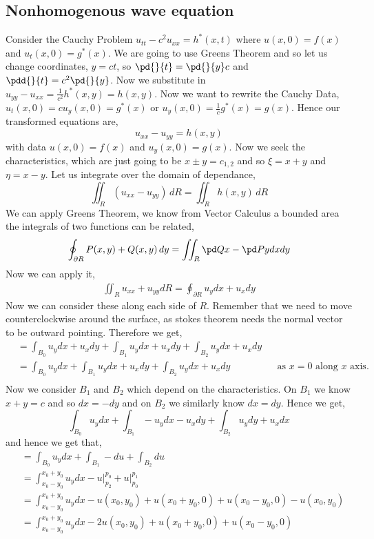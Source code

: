 \subsection{Nonhomogenous wave equation}
Consider the Cauchy Problem $u_{tt} - c^2u_{xx} = h^*(x, t)$ where $u(x, 0)= f(x)$ and $u_t(x, 0) = g^*(x)$. We are going to use Greens Theorem and so let us change coordinates, $y = ct$, so $\pd{}{t} = \pd{}{y}c$ and $\pdd{}{t} = c^2\pd{}{y}$. Now we substitute in $u_{yy} - u_{xx} = \frac{1}{c^2}h^*(x, y) = h(x, y)$. Now we want to rewrite the Cauchy Data, $u_{t} (x, 0) = cu_y(x, 0) = g^*(x)$ or $u_y(x, 0) = \frac{1}{c}g^*(x) = g(x)$. Hence our transformed equations are,
$$ u_{xx} - u_{yy} = h(x, y) $$
with data $u(x, 0) = f(x)$ and $u_y(x, 0) = g(x)$. Now we seek the characteristics, which are just going to be $x \pm y = c_{1, 2}$ and so $\xi = x + y$ and $\eta = x - y$.
Let us integrate over the domain of dependance,
$$ \iint_R (u_{xx} - u_{yy})\, dR = \iint_R h(x, y)\,dR $$
We can apply Greens Theorem, we know from Vector Calculus a bounded area the integrals of two functions can be related,
$$ \oint_{\partial R} P(x, y) + Q(x, y)\, dy = \iint_{R} \pd Q x - \pd P y dxdy $$
Now we can apply it,
\begin{align*}
  \iint_{R} u_{xx} + u_{yy} dR = \oint_{\partial R} u_ydx + u_xdy
\end{align*}
Now we can consider these along each side of $R$. Remember that we need to move counterclockwise around the surface, as stokes theorem needs the normal vector to be outward pointing. Therefore we get,
\begin{align*}
  &= \int_{B_0} u_ydx + u_xdy + \int_{B_1} u_ydx + u_xdy + \int_{B_2} u_ydx + u_xdy \\
  &= \int_{B_0} u_ydx + \int_{B_1} u_ydx + u_xdy + \int_{B_2} u_ydx + u_xdy && \text{as $x = 0$ along $x$ axis.} \\
\end{align*}
Now we consider $B_1$ and $B_2$ which depend on the characteristics. On $B_1$ we know $x + y = c$ and so $dx = -dy$ and on $B_2$ we similarly know $dx = dy$. Hence we get,
$$ \int_{B_0} u_ydx + \int_{B_1} -u_ydx - u_xdy + \int_{B_2} u_ydy + u_xdx $$
and hence we get that,
\begin{align*}
  &= \int_{B_0} u_ydx + \int_{B_1} -du + \int_{B_2} du \\
  &=\int_{x_0 - y_0}^{x_0 + y_0} u_ydx - \left.u\right|_{p_2}^{p_0} + \left. u\right|_{p_0}^{p_1} \\
  &= \int_{x_0 - y_0}^{x_0 + y_0} u_ydx - u(x_0, y_0) + u(x_0 + y_0, 0) + u(x_0 - y_0, 0) - u(x_0, y_0) \\
  &= \int_{x_0 - y_0}^{x_0 + y_0} u_ydx - 2u(x_0, y_0) + u(x_0 + y_0, 0) + u(x_0 - y_0, 0) \\
\end{align*}
